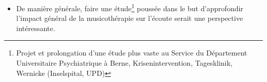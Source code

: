 \begin{itemize}
\item De manière générale, faire une étude\footnote{ Projet et
prolongation d'une étude plus vaste au Service du
Département Universitaire Psychiatrique à Berne, Krisenintervention,
Tagesklinik, Wernicke (Inselspital, UPD) } poussée dans le but d'approfondir l'impact général de la
  musicothérapie sur l'écoute serait une perspective intéressante.

\end{itemize}










   








